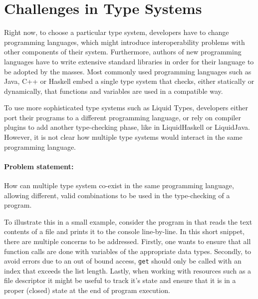 \documentclass{easychair}
\begin{document}
\section{Challenges in Type Systems}
\label{sec:challenges-in-type-systems}

Right now, to choose a particular type system, developers have to change programming languages, which might introduce interoperability problems with other components of their system. Furthermore, authors of new programming languages have to write extensive standard libraries in order for their language to be adopted by the masses.
 Most commonly used programming languages such as Java, C++ or Haskell embed a single type system that checks, either statically or dynamically, that functions and variables are used in a compatible way. 
 
 To use more sophisticated type systems such as Liquid Types, developers either port their programs to a different programming language, or rely on compiler plugins to add another type-checking phase, like in LiquidHaskell\cite{LiquidHaskell} or LiquidJava\cite{LiquidJava}. However, it is not clear how multiple type systems would interact in the same programming language. 
 
 \paragraph{Problem statement:} How can multiple type system co-exist in the same programming language, allowing different, valid combinations to be used in the type-checking of a program.
 
 
 To illustrate this in a small example, consider the program in  that reads the text contents of a file and prints it to the console line-by-line. In this short snippet, there are multiple concerns to be addressed. Firstly, one wants to ensure that all function calls are done with variables of the appropriate data types. Secondly, to avoid errors due to an out of bound access, \texttt{get} should only be called with an index that exceeds the list length. Lastly, when working with resources such as a file descriptor it might be useful to track it's state and ensure that it is in a proper (closed) state at the end of program execution.
 
\end{document}
